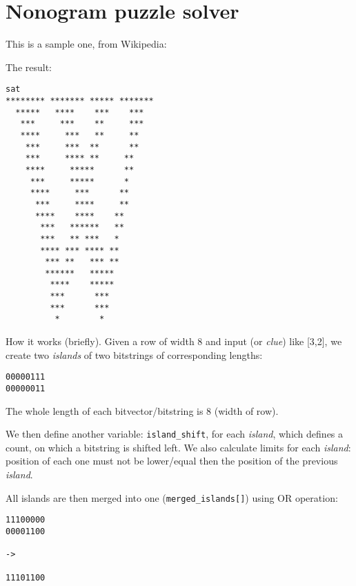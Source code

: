 \section{Nonogram puzzle solver}

\renewcommand{\CURPATH}{puzzles/nonogram}

This is a sample one, from Wikipedia:

\begin{figure}[H]
\centering
{}
\end{figure}



The result:

\begin{lstlisting}
sat                                                                                                       
******** ******* ***** *******
  *****   ****    ***    ***
   ***     ***    **     ***
   ****     ***   **     **
    ***     ***  **      **
    ***     **** **     **
    ****     *****      **
     ***     *****      *
     ****     ***      **
      ***     ****     **
      ****    ****    **
       ***   ******   **
       ***   ** ***   *
       **** *** **** **
        *** **   *** **
        ******   *****
         ****    *****
         ***      ***
         ***      ***
          *        *
\end{lstlisting}

How it works (briefly).
Given a row of width 8 and input (or \emph{clue}) like [3,2], we create two \emph{islands} of two bitstrings of corresponding
lengths:

\begin{lstlisting}
00000111
00000011
\end{lstlisting}

The whole length of each bitvector/bitstring is 8 (width of row).

We then define another variable: \verb|island_shift|, for each \emph{island}, which defines a count, on which a bitstring is shifted left.
We also calculate limits for each \emph{island}: position of each one must not be lower/equal then the position of the previous
\emph{island}.

All islands are then merged into one (\verb|merged_islands[]|) using OR operation:

\begin{lstlisting}
11100000
00001100

->

11101100
\end{lstlisting}

